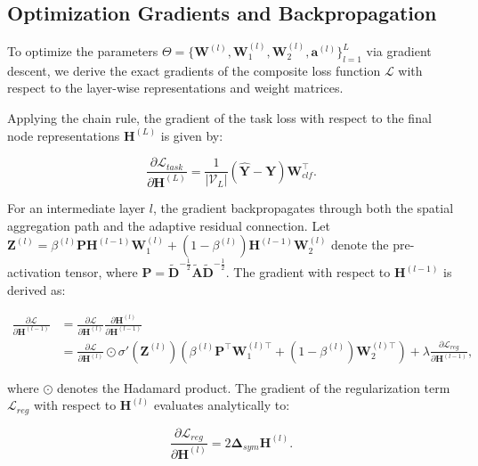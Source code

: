 \documentclass[10pt,twocolumn]{article}
\begin{document}
\subsection{Optimization Gradients and Backpropagation}

To optimize the parameters $\Theta = \{\mathbf{W}^{(l)}, \mathbf{W}_1^{(l)}, \mathbf{W}_2^{(l)}, \mathbf{a}^{(l)}\}_{l=1}^L$ via gradient descent, we derive the exact gradients of the composite loss function $\mathcal{L}$ with respect to the layer-wise representations and weight matrices. 

Applying the chain rule, the gradient of the task loss with respect to the final node representations $\mathbf{H}^{(L)}$ is given by:

\begin{equation}
\frac{\partial \mathcal{L}_{task}}{\partial \mathbf{H}^{(L)}} = \frac{1}{|\mathcal{V}_L|} (\hat{\mathbf{Y}} - \mathbf{Y}) \mathbf{W}_{clf}^\top.
\end{equation}

For an intermediate layer $l$, the gradient backpropagates through both the spatial aggregation path and the adaptive residual connection. Let $\mathbf{Z}^{(l)} = \beta^{(l)} \mathbf{P} \mathbf{H}^{(l-1)} \mathbf{W}_{1}^{(l)} + (1 - \beta^{(l)}) \mathbf{H}^{(l-1)} \mathbf{W}_{2}^{(l)}$ denote the pre-activation tensor, where $\mathbf{P} = \tilde{\mathbf{D}}^{-\frac{1}{2}} \tilde{\mathbf{A}} \tilde{\mathbf{D}}^{-\frac{1}{2}}$. The gradient with respect to $\mathbf{H}^{(l-1)}$ is derived as:

\begin{equation}
\begin{aligned}
\frac{\partial \mathcal{L}}{\partial \mathbf{H}^{(l-1)}} &= \frac{\partial \mathcal{L}}{\partial \mathbf{H}^{(l)}} \frac{\partial \mathbf{H}^{(l)}}{\partial \mathbf{H}^{(l-1)}} \\
&= \frac{\partial \mathcal{L}}{\partial \mathbf{H}^{(l)}} \odot \sigma'(\mathbf{Z}^{(l)}) \left( \beta^{(l)} \mathbf{P}^\top \mathbf{W}_{1}^{(l)\top} + (1 - \beta^{(l)}) \mathbf{W}_{2}^{(l)\top} \right) + \lambda \frac{\partial \mathcal{L}_{reg}}{\partial \mathbf{H}^{(l-1)}},
\end{aligned}
\end{equation}

where $\odot$ denotes the Hadamard product. The gradient of the regularization term $\mathcal{L}_{reg}$ with respect to $\mathbf{H}^{(l)}$ evaluates analytically to:

\begin{equation}
\frac{\partial \mathcal{L}_{reg}}{\partial \mathbf{H}^{(l)}} = 2 \mathbf{\Delta}_{sym} \mathbf{H}^{(l)}.
\end{equation}
\end{document}
